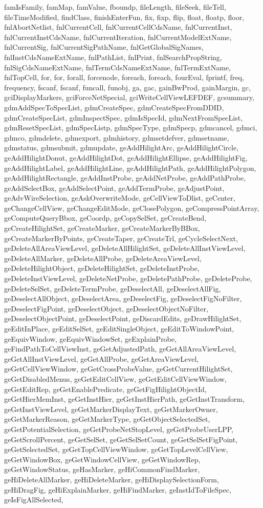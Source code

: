 {{famIsFamily, famMap, famValue, fboundp, fileLength, fileSeek, fileTell, fileTimeModified, findClass, finishEnterFun, fix, fixp, flip, float, floatp, floor, fnlAbortNetlist, fnlCurrentCell, fnlCurrentCellCdsName, fnlCurrentInst, fnlCurrentInstCdsName, fnlCurrentIteration, fnlCurrentModelExtName, fnlCurrentSig, fnlCurrentSigPathName, fnlGetGlobalSigNames, fnlInstCdsNameExtName, fnlPathList, fnlPrint, fnlSearchPropString, fnlSigCdsNameExtName, fnlTermCdsNameExtName, fnlTermExtName, fnlTopCell, for, for, forall, forcenode, foreach, foreach, fourEval, fprintf, freq, frequency, fscanf, fscanf, funcall, funobj, ga, gac, gainBwProd, gainMargin, gc, gciDisplayMarkers, gciForceNetSpecial, gciWriteCellViewLEFDEF, gcsummary, gdmAddSpecToSpecList, gdmCreateSpec, gdmCreateSpecFromDDID, gdmCreateSpecList, gdmInspectSpec, gdmIsSpecId, gdmNextFromSpecList, gdmResetSpecList, gdmSpecListp, gdmSpecType, gdmSpecp, gdmcancel, gdmci, gdmco, gdmdelete, gdmexport, gdmhistory, gdmsetdefver, gdmsetname, gdmstatus, gdmsubmit, gdmupdate, geAddHilightArc, geAddHilightCircle, geAddHilightDonut, geAddHilightDot, geAddHilightEllipse, geAddHilightFig, geAddHilightLabel, geAddHilightLine, geAddHilightPath, geAddHilightPolygon, geAddHilightRectangle, geAddInstProbe, geAddNetProbe, geAddPathProbe, geAddSelectBox, geAddSelectPoint, geAddTermProbe, geAdjustPoint, geAdvWireSelection, geAskOverwriteMode, geCellViewToDlist, geCenter, geChangeCellView, geChangeEditMode, geClosePolygon, geCompressPointArray, geComputeQueryBbox, geCoordp, geCopySelSet, geCreateBend, geCreateHilightSet, geCreateMarker, geCreateMarkerByBBox, geCreateMarkerByPoints, geCreateTaper, geCreateTrl, geCycleSelectNext, geDeleteAllAreaViewLevel, geDeleteAllHilightSet, geDeleteAllInstViewLevel, geDeleteAllMarker, geDeleteAllProbe, geDeleteAreaViewLevel, geDeleteHilightObject, geDeleteHilightSet, geDeleteInstProbe, geDeleteInstViewLevel, geDeleteNetProbe, geDeletePathProbe, geDeleteProbe, geDeleteSelSet, geDeleteTermProbe, geDeselectAll, geDeselectAllFig, geDeselectAllObject, geDeselectArea, geDeselectFig, geDeselectFigNoFilter, geDeselectFigPoint, geDeselectObject, geDeselectObjectNoFilter, geDeselectObjectPoint, geDeselectPoint, geDiscardEdits, geDrawHilightSet, geEditInPlace, geEditSelSet, geEditSingleObject, geEditToWindowPoint, geEquivWindow, geEquivWindowSet, geExplainProbe, geFindPathToCellViewInst, geGetAdjustedPath, geGetAllAreaViewLevel, geGetAllInstViewLevel, geGetAllProbe, geGetAreaViewLevel, geGetCellViewWindow, geGetCrossProbeValue, geGetCurrentHilightSet, geGetDisabledMenus, geGetEditCellView, geGetEditCellViewWindow, geGetEditRep, geGetEnablePredicate, geGetFigHilightObjectId, geGetHierMemInst, geGetInstHier, geGetInstHierPath, geGetInstTransform, geGetInstViewLevel, geGetMarkerDisplayText, geGetMarkerOwner, geGetMarkerReason, geGetMarkerType, geGetObjectSelectedSet, geGetPotentialSelection, geGetProbeNetStopLevel, geGetProbeUserLPP, geGetScrollPercent, geGetSelSet, geGetSelSetCount, geGetSelSetFigPoint, geGetSelectedSet, geGetTopCellViewWindow, geGetTopLevelCellView, geGetWindowBox, geGetWindowCellView, geGetWindowRep, geGetWindowStatus, geHasMarker, geHiCommonFindMarker, geHiDeleteAllMarker, geHiDeleteMarker, geHiDisplaySelectionForm, geHiDragFig, geHiExplainMarker, geHiFindMarker, geInstIdToFileSpec, geIsFigAllSelected, }}
